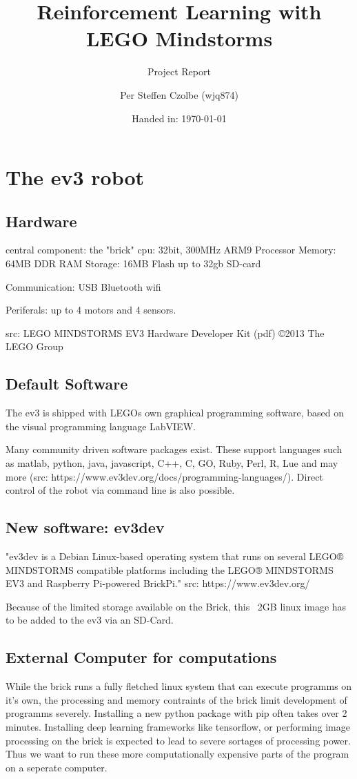 \documentclass[11pt, a4paper]{article}
\author{Per Steffen Czolbe (wjq874)}
\title{Reinforcement Learning with LEGO Mindstorms}
\subtitle{Project Report}
\date{Handed in: \today}
\begin{document}
\maketitle

\tableofcontents




\section{The ev3 robot}

\subsection{Hardware}
central component: the "brick"
cpu: 32bit, 300MHz ARM9 Processor
Memory: 64MB DDR RAM
Storage: 16MB Flash
up to 32gb SD-card

Communication:
USB
Bluetooth
wifi

Periferals:
up to 4 motors and 4 sensors.

src: LEGO MINDSTORMS EV3 Hardware Developer Kit (pdf) ©2013 The LEGO Group


\subsection{Default Software}
The ev3 is shipped with LEGOs own graphical programming software, based on the visual programming language LabVIEW.

Many community driven software packages exist. These support languages such as matlab, python, java, javascript, C++, C, GO, Ruby, Perl, R, Lue and may more (src: https://www.ev3dev.org/docs/programming-languages/). Direct control of the robot via command line is also possible.

\subsection{New software: ev3dev}
"ev3dev is a Debian Linux-based operating system that runs on several LEGO® MINDSTORMS compatible platforms including the LEGO® MINDSTORMS EV3 and Raspberry Pi-powered BrickPi." src: https://www.ev3dev.org/

Because of the limited storage available on the Brick, this ~2GB linux image has to be added to the ev3 via an SD-Card.

\subsection{External Computer for computations}
While the brick runs a fully fletched linux system that can execute programms on it's own, the processing and memory contraints of the brick limit development of programms severely. Installing a new python package with pip often takes over 2 minutes. Installing deep learning frameworks like tensorflow, or performing image processing on the brick is expected to lead to severe sortages of processing power. Thus we want to run these more computationally expensive parts of the program on a seperate computer.
\end{document}
